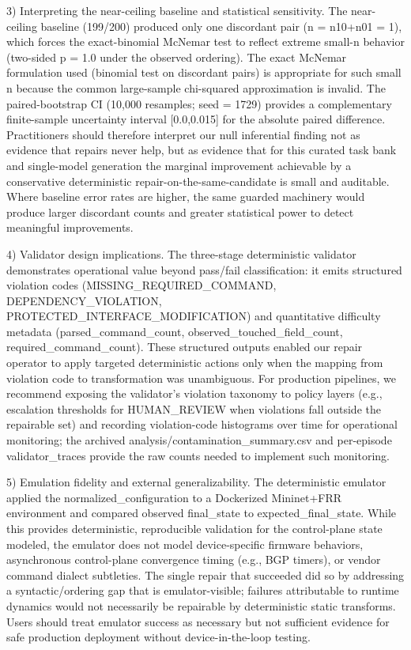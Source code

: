 \documentclass[conference]{IEEEtran}
\begin{document}
3) Interpreting the near-ceiling baseline and statistical sensitivity. The near-ceiling baseline (199/200) produced only one discordant pair (n = n10+n01 = 1), which forces the exact-binomial McNemar test to reflect extreme small-n behavior (two-sided p = 1.0 under the observed ordering). The exact McNemar formulation used (binomial test on discordant pairs) is appropriate for such small n because the common large-sample chi-squared approximation is invalid. The paired-bootstrap CI (10,000 resamples; seed = 1729) provides a complementary finite-sample uncertainty interval [0.0,0.015] for the absolute paired difference. Practitioners should therefore interpret our null inferential finding not as evidence that repairs never help, but as evidence that for this curated task bank and single-model generation the marginal improvement achievable by a conservative deterministic repair-on-the-same-candidate is small and auditable. Where baseline error rates are higher, the same guarded machinery would produce larger discordant counts and greater statistical power to detect meaningful improvements.

4) Validator design implications. The three-stage deterministic validator demonstrates operational value beyond pass/fail classification: it emits structured violation codes (MISSING\_REQUIRED\_COMMAND, DEPENDENCY\_VIOLATION, PROTECTED\_INTERFACE\_MODIFICATION) and quantitative difficulty metadata (parsed\_command\_count, observed\_touched\_field\_count, required\_command\_count). These structured outputs enabled our repair operator to apply targeted deterministic actions only when the mapping from violation code to transformation was unambiguous. For production pipelines, we recommend exposing the validator's violation taxonomy to policy layers (e.g., escalation thresholds for HUMAN\_REVIEW when violations fall outside the repairable set) and recording violation-code histograms over time for operational monitoring; the archived analysis/contamination\_summary.csv and per-episode validator\_traces provide the raw counts needed to implement such monitoring.

5) Emulation fidelity and external generalizability. The deterministic emulator applied the normalized\_configuration to a Dockerized Mininet+FRR environment and compared observed final\_state to expected\_final\_state. While this provides deterministic, reproducible validation for the control-plane state modeled, the emulator does not model device-specific firmware behaviors, asynchronous control-plane convergence timing (e.g., BGP timers), or vendor command dialect subtleties. The single repair that succeeded did so by addressing a syntactic/ordering gap that is emulator-visible; failures attributable to runtime dynamics would not necessarily be repairable by deterministic static transforms. Users should treat emulator success as necessary but not sufficient evidence for safe production deployment without device-in-the-loop testing.
\end{document}
